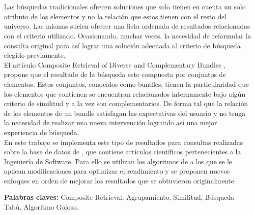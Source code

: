 \chapter*{\runtitulo}

\noindent Las búsquedas tradicionales ofrecen soluciones que solo tienen en cuenta un solo atributo de los elementos y no la relación que estos tienen con el resto del universo. Las mismas suelen ofrecer una lista ordenada de resultados relacionadas con
el criterio utilizado. Ocasionando, muchas veces, la necesidad de reformular la consulta original para así lograr una solución adecuada al criterio de búsqueda elegido previamente.\\
El artículo Composite Retrieval of Diverse and Complementary Bundles \cite{compositeRetrival}, propone que el resultado de la búsqueda este compuesta por conjuntos de elementos. Estos conjuntos, conocidos como bundles, tienen la particularidad que los elementos que contienen se encuentran relacionados internamente bajo algún criterio de similitud y a la vez son complementarios. De forma tal que la relación de los elementos de un bundle satisfagan las expectativas del usuario y no tenga la necesidad de realizar una nueva intervención logrando así una mejor experiencia de búsqueda.\\
En este trabajo se implementa este tipo de resultados para consultas realizadas sobre la base de datos de \cite{dataDrive}, que contiene artículos científicos pertenecientes a la Ingeniería de Software. Para ello se utilizan los algoritmos de \cite{compositeRetrival} a los que se le aplican modificaciones para optimizar el rendimiento y se proponen nuevos enfoques en orden de mejorar los resultados que se obtuvieron originalmente.

\bigskip

\noindent\textbf{Palabras claves:} Composite Retrieval, Agrupamiento, Similitud, Búsqueda Tabú, Algoritmo Goloso.